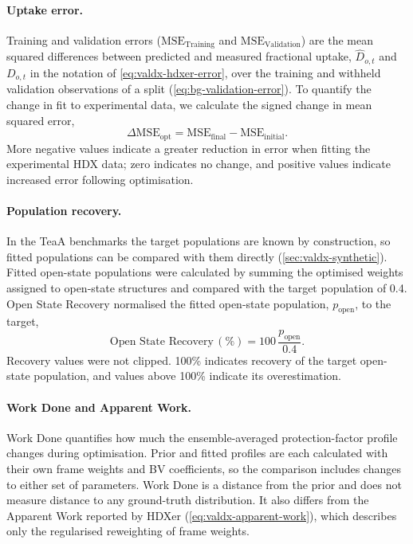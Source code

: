 \paragraph{Uptake error.}
Training and validation errors ($\text{MSE}_\text{Training}$ and $\text{MSE}_\text{Validation}$) are the mean squared differences between predicted and measured fractional uptake, $\hat D_{o,t}$ and $D_{o,t}$ in the notation of \cref{eq:valdx-hdxer-error}, over the training and withheld validation observations of a split (\cref{eq:bg-validation-error}). To quantify the change in fit to experimental data, we calculate the signed change in mean squared error,
\begin{equation}
    \Delta\text{MSE}_\text{opt}=\text{MSE}_\text{final}-\text{MSE}_\text{initial}.
    \label{eq:valdx-delta-mse}
\end{equation}
More negative values indicate a greater reduction in error when fitting the experimental HDX data; zero indicates no change, and positive values indicate increased error following optimisation.

\paragraph{Population recovery.}
In the TeaA benchmarks the target populations are known by construction, so fitted populations can be compared with them directly (\cref{sec:valdx-synthetic}). Fitted open-state populations were calculated by summing the optimised weights assigned to open-state structures and compared with the target population of 0.4. Open State Recovery normalised the fitted open-state population, $p_\text{open}$, to the target,
\begin{equation}
    \text{Open State Recovery}\,(\%)=100\,\frac{p_\text{open}}{0.4}.
    \label{eq:valdx-open-state-recovery}
\end{equation}
Recovery values were not clipped. 100\% indicates recovery of the target open-state population, and values above 100\% indicate its overestimation.

\paragraph{Work Done and Apparent Work.}
Work Done quantifies how much the ensemble-averaged protection-factor profile changes during optimisation. Prior and fitted profiles are each calculated with their own frame weights and BV coefficients, so the comparison includes changes to either set of parameters. Work Done is a distance from the prior and does not measure distance to any ground-truth distribution. It also differs from the Apparent Work reported by HDXer (\cref{eq:valdx-apparent-work}), which describes only the regularised reweighting of frame weights.

